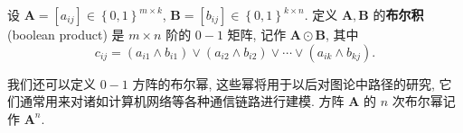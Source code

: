 \documentclass[10pt,UTF8]{book} %
\begin{document}
\begin{definition}[布尔积]
    设 $\boldsymbol{A} = [a_{ij}] \in \left\{0,1\right\}^{m \times k}$,
    $\boldsymbol{B} = [b_{ij}] \in \left\{0,1\right\}^{k \times n}$.
    定义 $\boldsymbol{A},\boldsymbol{B}$ 的\textbf{布尔积} (boolean product)
    是 $m \times n$ 阶的 $0-1$ 矩阵, 记作 $\boldsymbol{A} \odot \boldsymbol{B}$, 其中
    \begin{equation}
        c_{ij} = (a_{i1} \wedge b_{i1})\vee(a_{i2}\wedge b_{i2}) \vee \cdots \vee
        (a_{ik} \wedge b_{kj}).
    \end{equation}
\end{definition}

我们还可以定义 $0-1$ 方阵的布尔幂, 这些幂将用于以后对图论中路径的研究,
它们通常用来对诸如计算机网络等各种通信链路进行建模. 方阵 $\boldsymbol{A}$
的 $n$ 次布尔幂记作 $\boldsymbol{A}^n$.




\end{document}
